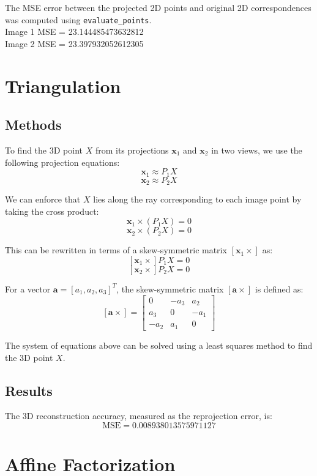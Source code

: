 {The MSE error between the projected 2D points and original 2D correspondences was computed using \texttt{evaluate\_points}.  
\\Image 1 MSE = 23.144485473632812
\\Image 2 MSE = 23.397932052612305

\section{Triangulation}
\subsection{Methods}
To find the 3D point \( X \) from its projections \( \mathbf{x}_1 \) and \( \mathbf{x}_2 \) in two views, we use the following projection equations:
\[
\mathbf{x}_1 \approx P_1 X
\]
\[
\mathbf{x}_2 \approx P_2 X
\]

We can enforce that \( X \) lies along the ray corresponding to each image point by taking the cross product:
\[
\mathbf{x}_1 \times (P_1 X) = 0
\]
\[
\mathbf{x}_2 \times (P_2 X) = 0
\]

This can be rewritten in terms of a skew-symmetric matrix \([ \mathbf{x}_1 \times ]\) as:
\[
[ \mathbf{x}_1 \times ] P_1 X = 0
\]
\[
[ \mathbf{x}_2 \times ] P_2 X = 0
\]

For a vector \( \mathbf{a} = [a_1, a_2, a_3]^T \), the skew-symmetric matrix \([ \mathbf{a} \times ]\) is defined as:
\[
[ \mathbf{a} \times ] = 
\begin{bmatrix}
	0 & -a_3 & a_2 \\
	a_3 & 0 & -a_1 \\
	-a_2 & a_1 & 0 
\end{bmatrix}
\]

The system of equations above can be solved using a least squares method to find the 3D point \( X \).

\subsection{Results}
The 3D reconstruction accuracy, measured as the reprojection error, is:
\begin{equation}
	\text{MSE} = 0.008938013575971127
\end{equation}

\section{Affine Factorization}

}
